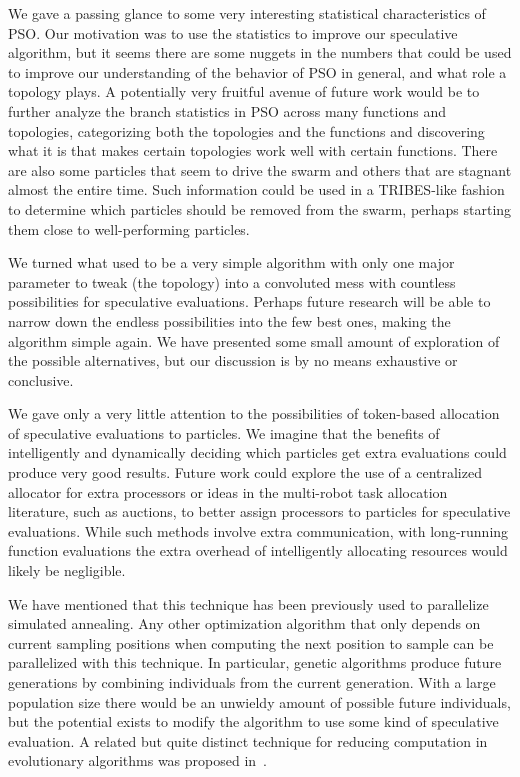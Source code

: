\documentclass[journal,letterpaper]{IEEEtran}
\begin{document}
We gave a passing glance to some very interesting statistical characteristics
of PSO.  Our motivation was to use the statistics to improve our speculative
algorithm, but it seems there are some nuggets in the numbers that could be
used to improve our understanding of the behavior of PSO in general, and what
role a topology plays.  A potentially very fruitful avenue of future work would
be to further analyze the branch statistics in PSO across many functions and
topologies, categorizing both the topologies and the functions and discovering
what it is that makes certain topologies work well with certain functions.
There are also some particles that seem to drive the swarm and others that are
stagnant almost the entire time.  Such information could be used in a
TRIBES-like fashion to determine which particles should be removed from the
swarm, perhaps starting them close to well-performing particles.

We turned what used to be a very simple algorithm with only one major parameter
to tweak (the topology) into a convoluted mess with countless possibilities for
speculative evaluations.  Perhaps future research will be able to narrow down
the endless possibilities into the few best ones, making the algorithm simple
again.  We have presented some small amount of exploration of the possible
alternatives, but our discussion is by no means exhaustive or conclusive.

We gave only a very little attention to the possibilities of token-based
allocation of speculative evaluations to particles.  We imagine that the
benefits of intelligently and dynamically deciding which particles get extra
evaluations could produce very good results.  Future work could explore the use
of a centralized allocator for extra processors or ideas in the multi-robot
task allocation literature, such as auctions, to better assign processors to
particles for speculative evaluations.  While such methods involve extra
communication, with long-running function evaluations the extra overhead of
intelligently allocating resources would likely be negligible.

We have mentioned that this technique has been previously used to parallelize
simulated annealing.  Any other optimization algorithm that only depends on 
current sampling positions when computing the next position to sample can be
parallelized with this technique.  In particular, genetic algorithms produce
future generations by combining individuals from the current generation.  With
a large population size there would be an unwieldy amount of possible future
individuals, but the potential exists to modify the algorithm to use some kind
of speculative evaluation.  A related but quite distinct technique for reducing
computation in evolutionary algorithms was proposed in~\cite{poli-ai06}.
\end{document}
